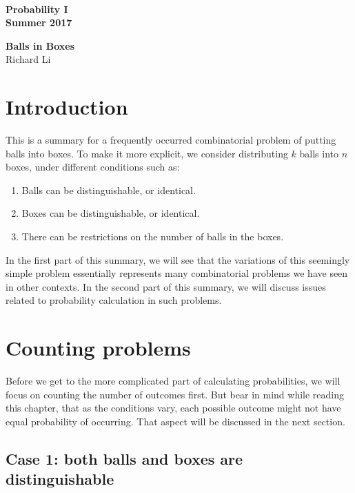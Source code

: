 \documentclass[12pt]{article}
\begin{document}
\\
{\bf Probability I}\\
{\bf Summer 2017}\\


\vspace{5mm}

\begin{center}
{\bf\Large Balls in Boxes}\\
\vspace{5mm}
{Richard Li}
\end{center}
\vspace{2mm}
\section{Introduction}
This is a summary for a frequently occurred combinatorial problem of putting balls into boxes. To make it more explicit, we consider distributing $k$ balls into $n$ boxes, under different conditions such as:
\begin{enumerate}
	\item Balls can be distinguishable, or identical.
	\item Boxes can be distinguishable, or identical.
	\item There can be restrictions on the number of balls in the boxes. 
\end{enumerate}

In the first part of this summary, we will see that the variations of this seemingly simple problem essentially represents many combinatorial problems we have seen in other contexts. In the second part of this summary, we will discuss issues related to probability calculation in such problems. 

\section{Counting problems}
Before we get to the more complicated part of calculating probabilities, we will focus on counting the number of outcomes first. But bear in mind while reading this chapter, that as the conditions vary, each possible outcome might not have equal probability of occurring. That aspect will be discussed in the next section. 

\subsection{Case 1: both balls and boxes are distinguishable}
\end{document}
